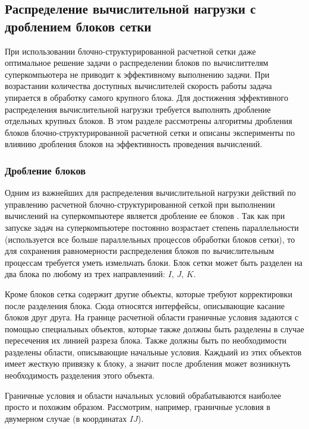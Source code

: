 \subsection{Распределение вычислительной нагрузки с дроблением блоков сетки}

При использовании блочно-структурированной расчетной сетки даже оптимальное решение задачи о распределении блоков по вычислиттелям суперкомпьютера не приводит к эффективному выполнению задачи.
При возрастании количества доступных вычислителей скорость работы задача упирается в обработку самого крупного блока.
Для достижения эффективного распределения вычислительной нагрузки требуется выполнять дробление отдельных крупных блоков.
В этом разделе рассмотрены алгоритмы дробления блоков блочно-структурированной расчетной сетки и описаны эксперименты по влиянию дробления блоков на эффективность проведения вычислений.

\subsubsection{Дробление блоков}

Одним из важнейших для распределения вычислительной нагрузки действий по управлению расчетной блочно-структурированной сеткой при выполнении вычислений на суперкомпьютере является дробление ее блоков \cite{Rybakov2016WithCut}.
Так как при запуске задач на суперкомпьютере постоянно возрастает степень параллельности (используется все больше параллельных процессов обработки блоков сетки), то для сохранения равномерности распределения блоков по вычислительным процессам требуется уметь измельчать блоки.
Блок сетки может быть разделен на два блока по любому из трех направлениий: $I$, $J$, $K$.

Кроме блоков сетка содержит другие объекты, которые требуют корректировки после разделения блока.
Сюда относятся интерфейсы, описывающие касание блоков друг друга.
На границе расчетной области граничные условия задаются с помощью специальных объектов, которые также должны быть разделены в случае пересечения их линией разреза блока.
Также должны быть по необходимости разделены области, описывающие начальные условия.
Каждыий из этих объектов имеет жесткую привязку к блоку, а значит после дробления может возникнуть
необходимость разделения этого объекта.

Граничные условия и области начальных условий обрабатываются наиболее просто и похожим образом.
Рассмотрим, например, граничные условия в двумерном случае (в координатах $IJ$).

